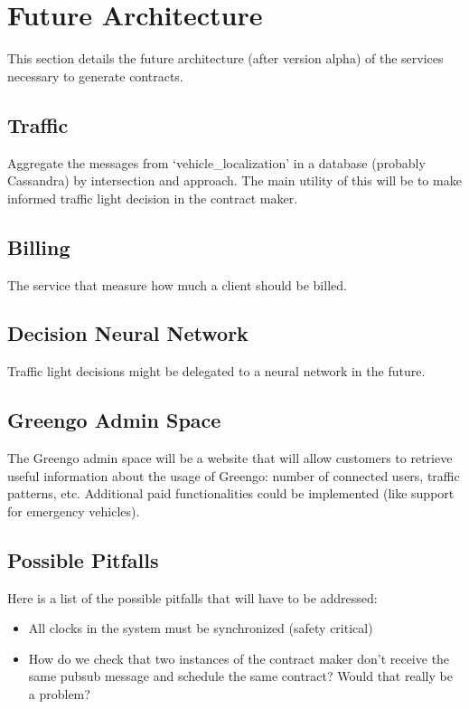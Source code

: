 \documentclass[letterpaper,10pt,english]{sphinxmanual}
\begin{document}
\section{Future Architecture}
\label{\detokenize{system_architecture:future-architecture}}
This section details the future architecture (after version alpha) of the services necessary to generate contracts.


\subsection{Traffic}
\label{\detokenize{system_architecture:traffic}}
Aggregate the messages from ‘vehicle\_localization’ in a database (probably Cassandra) by intersection and approach.
The main utility of this will be to make informed traffic light decision in the contract maker.


\subsection{Billing}
\label{\detokenize{system_architecture:billing}}
The service that measure how much a client should be billed.


\subsection{Decision Neural Network}
\label{\detokenize{system_architecture:decision-neural-network}}
Traffic light decisions might be delegated to a neural network in the future.


\subsection{Greengo Admin Space}
\label{\detokenize{system_architecture:greengo-admin-space}}
The Greengo admin space will be a website that will allow customers to retrieve useful information about the usage of Greengo: number of connected users, traffic patterns, etc. Additional paid functionalities could be implemented (like support for emergency vehicles).


\subsection{Possible Pitfalls}
\label{\detokenize{system_architecture:possible-pitfalls}}
Here is a list of the possible pitfalls that will have to be addressed:
\begin{itemize}
\item {} 
All clocks in the system must be synchronized (safety critical)

\item {} 
How do we check that two instances of the contract maker don’t receive the same pubsub message and schedule the same contract? Would that really be a problem?

\end{itemize}
\end{document}
